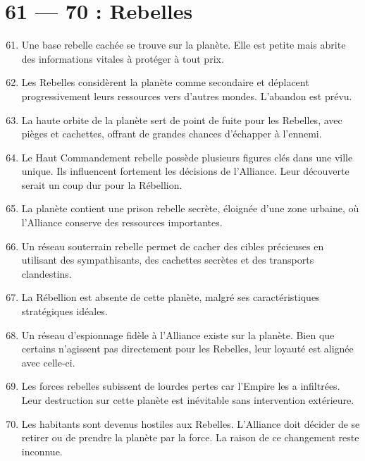 \documentclass{article}
\begin{document}
\section*{61 --- 70 : Rebelles}
\begin{enumerate}
	\setcounter{enumi}{60}
	\item Une base rebelle cachée se trouve sur la planète. Elle est petite mais abrite des informations vitales à protéger à tout prix.
	\item Les Rebelles considèrent la planète comme secondaire et déplacent progressivement leurs ressources vers d’autres mondes. L’abandon est prévu.
	\item La haute orbite de la planète sert de point de fuite pour les Rebelles, avec pièges et cachettes, offrant de grandes chances d’échapper à l’ennemi.
	\item Le Haut Commandement rebelle possède plusieurs figures clés dans une ville unique. Ils influencent fortement les décisions de l’Alliance. Leur découverte serait un coup dur pour la Rébellion.
	\item La planète contient une prison rebelle secrète, éloignée d’une zone urbaine, où l’Alliance conserve des ressources importantes.
	\item Un réseau souterrain rebelle permet de cacher des cibles précieuses en utilisant des sympathisants, des cachettes secrètes et des transports clandestins.
	\item La Rébellion est absente de cette planète, malgré ses caractéristiques stratégiques idéales.
	\item Un réseau d’espionnage fidèle à l’Alliance existe sur la planète. Bien que certains n’agissent pas directement pour les Rebelles, leur loyauté est alignée avec celle-ci.
	\item Les forces rebelles subissent de lourdes pertes car l’Empire les a infiltrées. Leur destruction sur cette planète est inévitable sans intervention extérieure.
	\item Les habitants sont devenus hostiles aux Rebelles. L’Alliance doit décider de se retirer ou de prendre la planète par la force. La raison de ce changement reste inconnue.
\end{enumerate}
\end{document}
